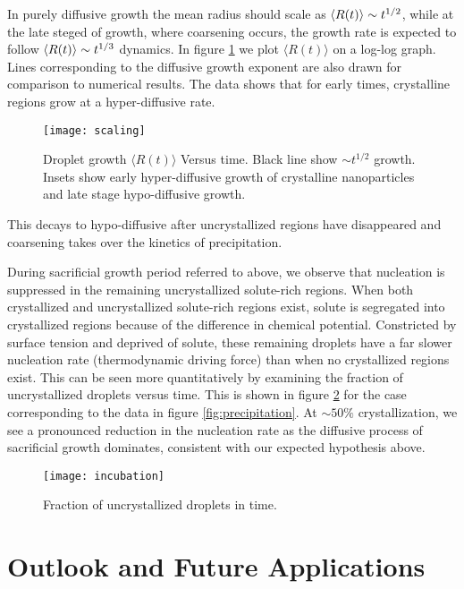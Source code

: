 In purely diffusive growth the mean radius should scale as $\left\langle R(t) \right\rangle \sim
t^{1/2}$, while at the late steged of growth, where coarsening occurs, the
growth rate is expected to follow  $\left\langle R(t) \right\rangle \sim t^{1/3}$ dynamics.  In
figure \ref{fig:scaling} we plot $\langle R(t)\rangle$ on a log-log graph.
Lines corresponding to the diffusive growth exponent are also drawn for
comparison to numerical results. The data shows that for early times,
crystalline regions grow at a hyper-diffusive rate. 
%
\begin{figure}
    \centering
    \texttt{[image: scaling]}
    \caption{
        \label{fig:scaling}
        Droplet growth $\langle R(t) \rangle$ Versus time. Black line show
        $\sim t^{1/2}$ growth. Insets show early hyper-diffusive growth
        of crystalline nanoparticles and late stage hypo-diffusive growth.
    }
\end{figure}
%
This decays to hypo-diffusive after uncrystallized regions have disappeared and
coarsening takes over the kinetics of precipitation.


During sacrificial growth period referred to above, we observe that nucleation
is suppressed in the remaining uncrystallized solute-rich regions. When both
crystallized and uncrystallized solute-rich regions exist, solute is segregated
into crystallized regions because of the difference in chemical potential.
Constricted by surface tension and deprived of solute, these remaining droplets
have a far slower nucleation rate (thermodynamic driving force) than when no
crystallized regions exist. This can be seen more quantitatively by examining
the fraction of uncrystallized droplets versus time. This is shown in figure
\ref{fig:incubation} for the case corresponding to the data in figure
\ref{fig:precipitation}. At $\sim 50\%$ crystallization, we see a pronounced
reduction in the nucleation rate as the diffusive process of sacrificial growth
dominates, consistent with our expected hypothesis above.
%
\begin{figure}
    \centering
    \texttt{[image: incubation]}
    \caption[Fraction of uncrystallized droplets in time]{
        \label{fig:incubation}
        Fraction of uncrystallized droplets in time.
    }
\end{figure}

\section{Outlook and Future Applications} %

